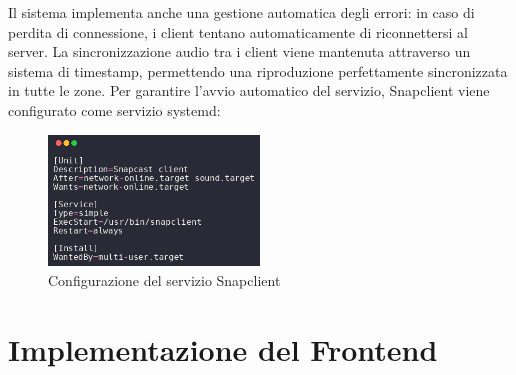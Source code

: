 Il sistema implementa anche una gestione automatica degli errori: in caso di perdita di connessione, i client tentano automaticamente di riconnettersi al server. La sincronizzazione audio tra i client viene mantenuta attraverso un sistema di timestamp, permettendo una riproduzione perfettamente sincronizzata in tutte le zone.
Per garantire l'avvio automatico del servizio, Snapclient viene configurato come servizio systemd:

\begin{figure}[H]
    \centering
    \includegraphics[width=0.5\textwidth]{Chapters/Figures/snap_service_audio.png}
    \caption{\small Configurazione del servizio Snapclient} 
    \label{fig:snap_service_audio}
\end{figure}

\section{Implementazione del Frontend}
\noindent
